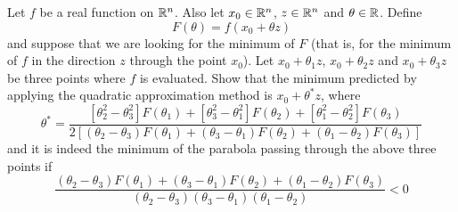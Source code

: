 \begin{proposition}
    Let \(f\) be a real function on \(\mathbb{R}^n\). Also let \(x_0 \in \mathbb{R}^n\), \(z \in \mathbb{R}^n\) and \(\theta \in \mathbb{R}\). Define
    \[F(\theta)=f(x_0 + \theta z)\]
    and suppose that we are looking for the minimum of \(F\) (that is, for the minimum of \(f\) in the direction \(z\) through the point \(x_0\)). Let \(x_0 + \theta_1 z\), \(x_0 + \theta_2 z\) and \(x_0 + \theta_3 z\) be three points where \(f\) is evaluated. Show that the minimum predicted by applying the quadratic approximation method is \(x_0 + \theta^* z\), where
    \[\theta^* = \frac{[\theta_2^2-\theta_3^2]F(\theta_1) + [\theta_3^2-\theta_1^2]F(\theta_2) + [\theta_1^2-\theta_2^2]F(\theta_3)}{2[(\theta_2 - \theta_3)F(\theta_1) + (\theta_3 - \theta_1)F(\theta_2) + (\theta_1 - \theta_2)F(\theta_3)]}\]
    and it is indeed the minimum of the parabola passing through the above three points if
    \[\frac{(\theta_2-\theta_3)F(\theta_1) + (\theta_3-\theta_1)F(\theta_2) + (\theta_1-\theta_2)F(\theta_3)}{(\theta_2-\theta_3)(\theta_3-\theta_1)(\theta_1-\theta_2)}<0\]
\end{proposition}